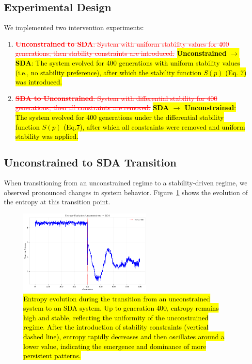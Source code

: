 \documentclass[preprint,12pt]{elsarticle}
\newcommand{\added}[1]{\hl{#1}}
\newcommand{\deleted}[1]{\textcolor{red}{\sout{#1}}}
\begin{document}
\subsection{Experimental Design}

We implemented two intervention experiments:

\begin{enumerate}
    \item \deleted{\textbf{Unconstrained to SDA}: System with uniform stability values for 400 generations, then stability constraints are introduced.}
    \added{\textbf{Unconstrained $\to$ SDA}: The system evolved for 400 generations
    with uniform stability values (i.e., no stability preference), after which
    the stability function $S(p)$ (Eq. 7) was introduced.}
    
    \item \deleted{\textbf{SDA to Unconstrained}: System with differential stability for 400 generations, then all constraints are removed.}
    \added{\textbf{SDA $\to$ Unconstrained}: The system evolved for 400 generations
    under the differential stability function $S(p)$ (Eq.7), after
    which all constraints were removed and uniform stability was applied.}
\end{enumerate}

\subsection{Unconstrained to SDA Transition}

When transitioning from an unconstrained regime to a stability-driven regime, we observed pronounced changes in system behavior. Figure~\ref{fig:u2s-entropy} shows the evolution of the entropy at this transition point.

\begin{figure}[H]
    \centering
    \includegraphics[width=0.6\textwidth]{figure_6.png}
        \caption{\added{Entropy evolution during the transition from an unconstrained system to an SDA system. 
        Up to generation 400, entropy remains high and stable,
        reflecting the uniformity of the unconstrained regime. After the introduction of stability constraints (vertical dashed line), entropy rapidly decreases and then oscillates around a lower value, indicating the emergence and dominance of more persistent patterns.}}
    \label{fig:u2s-entropy}
\end{figure}
\end{document}

